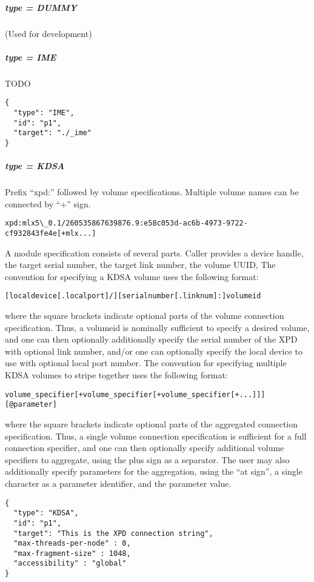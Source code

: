 \subparagraph{type = DUMMY}

(Used for development)

\subparagraph{type = IME}
TODO

\begin{lstlisting}
{
  "type": "IME",
  "id": "p1",
  "target": "./_ime"
}
\end{lstlisting}

\subparagraph{type = KDSA}

Prefix ``xpd:'' followed by volume specifications. Multiple volume names can be connected by ``+'' sign.

\begin{lstlisting}
xpd:mlx5\_0.1/260535867639876.9:e58c053d-ac6b-4973-9722-cf932843fe4e[+mlx...]
\end{lstlisting}

A module specification consists of several parts.
Caller provides a device handle, the target serial number, the target link number, the volume UUID,
The convention for specifying a KDSA volume uses the following format:

\begin{lstlisting}
[localdevice[.localport]/][serialnumber[.linknum]:]volumeid
\end{lstlisting}

where the square brackets indicate optional parts of the volume connection specification.
Thus, a volumeid is nominally sufficient to specify a desired volume, and one can then optionally additionally 
specify the serial number of the XPD with optional link number, and/or one can optionally specify the local 
device to use with optional local port number.
The convention for specifying multiple KDSA volumes to stripe together uses the following format:

\begin{lstlisting}
volume_specifier[+volume_specifier[+volume_specifier[+...]]][@parameter]
\end{lstlisting}

where the square brackets indicate optional parts of the aggregated connection specification. Thus, a single
volume connection specification is sufficient for a full connection specifier, and one can then optionally specify
additional volume specifiers to aggregate, using the plus sign as a separator. The user may also additionally
specify parameters for the aggregation, using the “at sign”, a single character as a parameter identifier, and the
parameter value.

\begin{lstlisting}
{
  "type": "KDSA",
  "id": "p1",
  "target": "This is the XPD connection string",
  "max-threads-per-node" : 0,
  "max-fragment-size" : 1048,
  "accessibility" : "global"
}
\end{lstlisting}


